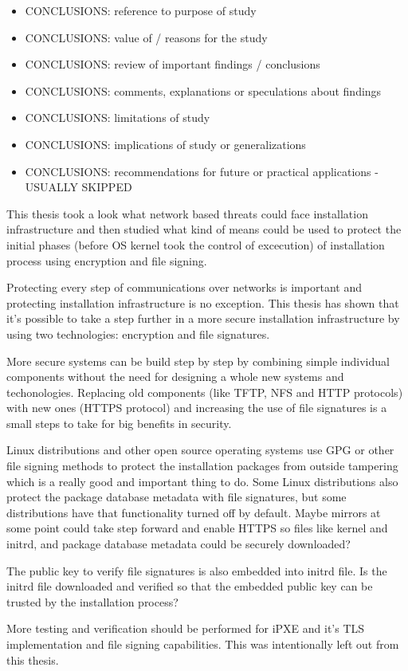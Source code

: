 
\begin{itemize}
\item CONCLUSIONS: reference to purpose of study
\item CONCLUSIONS: value of / reasons for the study
\item CONCLUSIONS: review of important findings / conclusions
\item CONCLUSIONS: comments, explanations or speculations about findings
\item CONCLUSIONS: limitations of study
\item CONCLUSIONS: implications of study or generalizations
\item CONCLUSIONS: recommendations for future or practical applications - USUALLY SKIPPED
\end{itemize}

This thesis took a look what network based threats could face
installation infrastructure and then studied what kind of means could
be used to protect the initial phases (before OS kernel took the
control of excecution) of installation process using encryption and
file signing.

Protecting every step of communications over networks is important and
protecting installation infrastructure is no exception. This thesis
has shown that it's possible to take a step further in a more secure
installation infrastructure by using two technologies: encryption and
file signatures.

More secure systems can be build step by step by combining simple
individual components without the need for designing a whole new
systems and techonologies. Replacing old components (like TFTP, NFS
and HTTP protocols) with new ones (HTTPS protocol) and increasing the
use of file signatures is a small steps to take for big benefits in
security.

Linux distributions and other open source operating systems use GPG or
other file signing methods to protect the installation packages from
outside tampering which is a really good and important thing to
do. Some Linux distributions also protect the package database
metadata with file signatures, but some distributions have that
functionality turned off by default. Maybe mirrors at some point could
take step forward and enable HTTPS so files like kernel and initrd,
and package database metadata could be securely downloaded?

The public key to verify file signatures is also embedded into initrd
file. Is the initrd file downloaded and verified so that the embedded
public key can be trusted by the installation process?

More testing and verification should be performed for iPXE and it's
TLS implementation and file signing capabilities. This was
intentionally left out from this thesis.
